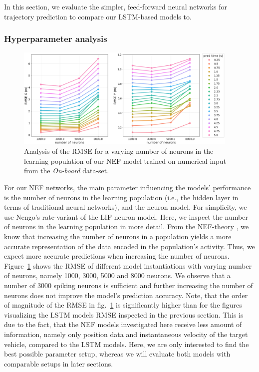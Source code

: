 In this section, we evaluate the simpler, feed-forward neural networks for trajectory prediction to compare our \ac{LSTM}-based models to.

\subsubsection{Hyperparameter analysis}%
\label{ssubsec:hyperparameter_analysis_nef}

\begin{figure}[t!]
  \centering
  \includegraphics[width=0.95\textwidth]{imgs/nef_num_neurons_analysis.eps}
  \caption{Analysis of the \ac{RMSE} for a varying number of neurons in the learning population of our \ac{NEF} model trained on numerical input from the \emph{On-board} data-set.}
  \label{fig:nef_num_neurons_analysis}
\end{figure}

For our \ac{NEF} networks, the main parameter influencing the models' performance is the number of neurons in the learning population (i.e., the hidden layer in terms of traditional neural networks), and the neuron model.
For simplicity, we use \acs{Nengo}'s rate-variant of the \ac{LIF} neuron model.
Here, we inspect the number of neurons in the learning population in more detail.
From the \ac{NEF}-theory \cite{Eliasmith2003}, we know that increasing the number of neurons in a population yields a more accurate representation of the data encoded in the population's activity.
Thus, we expect more accurate predictions when increasing the number of neurons.
Figure~\ref{fig:nef_num_neurons_analysis} shows the \ac{RMSE} of different model instantiations with varying number of neurons, namely \num{1000}, \num{3000}, \num{5000} and \num{8000} neurons.
We observe that a number of \num{3000} spiking neurons is sufficient and further increasing the number of neurons does not improve the model's prediction accuracy.
Note, that the order of magnitude of the \ac{RMSE} in fig.~\ref{fig:nef_num_neurons_analysis} is significantly higher than for the figures visualizing the \ac{LSTM} models \ac{RMSE} inspected in the previous section. 
This is due to the fact, that the \ac{NEF} models investigated here receive less amount of information, namely only position data and instantaneous velocity of the target vehicle, compared to the \ac{LSTM} models.
Here, we are only interested to find the best possible parameter setup, whereas we will evaluate both models with comparable setups in later sections.

